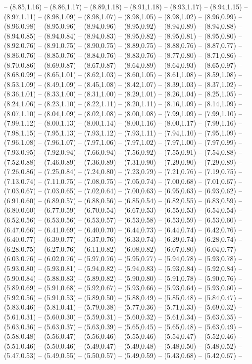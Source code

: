 {-- (8.85,1.16) -- (8.86,1.17) -- (8.89,1.18) -- (8.91,1.18) -- (8.93,1.17) -- (8.94,1.15) -- (8.97,1.11) -- (8.98,1.09) -- (8.98,1.07) -- (8.98,1.05) -- (8.98,1.02) -- (8.96,0.99) -- (8.96,0.98) -- (8.95,0.96) -- (8.94,0.96) -- (8.95,0.92) -- (8.94,0.89) -- (8.94,0.88) -- (8.94,0.85) -- (8.94,0.84) -- (8.94,0.83) -- (8.95,0.82) -- (8.95,0.81) -- (8.95,0.80) -- (8.92,0.76) -- (8.91,0.75) -- (8.90,0.75) -- (8.89,0.75) -- (8.88,0.76) -- (8.87,0.77) -- (8.86,0.76) -- (8.85,0.76) -- (8.84,0.76) -- (8.83,0.76) -- (8.77,0.80) -- (8.71,0.86) -- (8.70,0.86) -- (8.69,0.87) -- (8.67,0.87) -- (8.64,0.89) -- (8.64,0.93) -- (8.65,0.97) -- (8.68,0.99) -- (8.65,1.01) -- (8.62,1.03) -- (8.60,1.05) -- (8.61,1.08) -- (8.59,1.08) -- (8.53,1.09) -- (8.49,1.09) -- (8.45,1.08) -- (8.42,1.07) -- (8.39,1.03) -- (8.37,1.02) -- (8.36,1.01) -- (8.33,1.00) -- (8.31,1.00) -- (8.29,1.01) -- (8.26,1.04) -- (8.25,1.05) -- (8.24,1.06) -- (8.23,1.10) -- (8.22,1.11) -- (8.20,1.11) -- (8.16,1.09) -- (8.14,1.09) -- (8.07,1.10) -- (8.04,1.09) -- (8.02,1.08) -- (8.00,1.08) -- (7.99,1.09) -- (7.99,1.10) -- (7.99,1.12) -- (8.00,1.13) -- (8.00,1.14) -- (8.00,1.16) -- (8.00,1.17) -- (7.99,1.16) -- (7.98,1.15) -- (7.95,1.13) -- (7.93,1.12) -- (7.93,1.11) -- (7.94,1.10) -- (7.95,1.09) -- (7.96,1.08) -- (7.96,1.07) -- (7.97,1.06) -- (7.97,1.02) -- (7.97,1.00) -- (7.97,0.99) -- (7.93,0.95) -- (7.92,0.94) -- (7.66,0.94) -- (7.56,0.92) -- (7.55,0.91) -- (7.54,0.88) -- (7.52,0.88) -- (7.46,0.89) -- (7.36,0.89) -- (7.31,0.90) -- (7.29,0.90) -- (7.29,0.89) -- (7.26,0.86) -- (7.25,0.84) -- (7.24,0.80) -- (7.23,0.79) -- (7.21,0.76) -- (7.19,0.75) -- (7.13,0.74) -- (7.11,0.75) -- (7.08,0.75) -- (7.05,0.74) -- (7.00,0.68) -- (7.01,0.67) -- (7.03,0.67) -- (7.03,0.65) -- (7.02,0.64) -- (7.00,0.63) -- (6.95,0.63) -- (6.93,0.62) -- (6.91,0.60) -- (6.89,0.57) -- (6.88,0.56) -- (6.85,0.54) -- (6.82,0.55) -- (6.83,0.59) -- (6.80,0.60) -- (6.77,0.59) -- (6.70,0.54) -- (6.67,0.53) -- (6.55,0.53) -- (6.54,0.54) -- (6.52,0.56) -- (6.53,0.56) -- (6.53,0.57) -- (6.53,0.58) -- (6.53,0.59) -- (6.53,0.60) -- (6.47,0.66) -- (6.41,0.69) -- (6.40,0.70) -- (6.44,0.73) -- (6.44,0.74) -- (6.42,0.76) -- (6.40,0.77) -- (6.39,0.77) -- (6.37,0.76) -- (6.33,0.74) -- (6.29,0.74) -- (6.28,0.74) -- (6.28,0.75) -- (6.27,0.76) -- (6.11,0.82) -- (6.08,0.82) -- (6.07,0.80) -- (6.04,0.77) -- (6.03,0.76) -- (6.02,0.76) -- (5.97,0.76) -- (5.95,0.77) -- (5.94,0.78) -- (5.93,0.78) -- (5.93,0.80) -- (5.93,0.81) -- (5.94,0.82) -- (5.94,0.83) -- (5.93,0.84) -- (5.92,0.84) -- (5.90,0.84) -- (5.88,0.83) -- (5.89,0.82) -- (5.90,0.80) -- (5.91,0.78) -- (5.90,0.76) -- (5.89,0.69) -- (5.91,0.68) -- (5.92,0.67) -- (5.93,0.66) -- (5.93,0.64) -- (5.93,0.60) -- (5.92,0.56) -- (5.91,0.53) -- (5.89,0.50) -- (5.88,0.49) -- (5.85,0.48) -- (5.84,0.47) -- (5.83,0.46) -- (5.81,0.41) -- (5.79,0.38) -- (5.77,0.36) -- (5.71,0.33) -- (5.69,0.32) -- (5.61,0.31) -- (5.60,0.30) -- (5.59,0.31) -- (5.60,0.32) -- (5.61,0.34) -- (5.63,0.35) -- (5.63,0.36) -- (5.63,0.37) -- (5.63,0.39) -- (5.65,0.45) -- (5.65,0.48) -- (5.63,0.49) -- (5.58,0.48) -- (5.56,0.47) -- (5.56,0.46) -- (5.55,0.46) -- (5.54,0.47) -- (5.52,0.46) -- (5.51,0.46) -- (5.50,0.46) -- (5.49,0.47) -- (5.49,0.48) -- (5.48,0.50) -- (5.48,0.52) -- (5.47,0.53) -- (5.49,0.55) -- (5.50,0.57) -- (5.49,0.59) -- (5.43,0.68) -- (5.42,0.67) -- }
